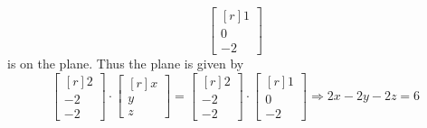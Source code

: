\documentclass[../main.tex]{subfiles}
\begin{document}
\begin{enumerate}[a)]
\[\begin{bmatrix*}[r]
				1 \\
				0 \\
				-2
			\end{bmatrix*}
		\]
		is on the plane.
		Thus the plane is given by
		\[
			\begin{bmatrix*}[r]
				2 \\
				-2 \\
				-2
			\end{bmatrix*}
			\cdot
			\begin{bmatrix*}[r]
				x \\
				y \\
				z
			\end{bmatrix*}
			=
			\begin{bmatrix*}[r]
				2 \\
				-2 \\
				-2
			\end{bmatrix*}
			\cdot
			\begin{bmatrix*}[r]
				1 \\
				0 \\
				-2
			\end{bmatrix*}
			\Rightarrow
			2x - 2y - 2z = 6
		\]
\end{enumerate}
\end{document}

